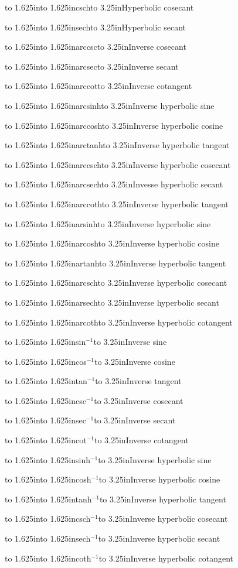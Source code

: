 \documentclass[12pt,twoside]{article}
\def\showop#1#2#3{\noindent
  \hbox to 1.625in{\texttt{\string#1}\hfil}\hbox to 1.625in{#2\hfil}\hbox to 3.25in{#3\hfil}%
  \par}
\begin{document}
\showop{\csch}{csch}{Hyperbolic cosecant}
\showop{\sech}{sech}{Hyperbolic secant}
\showop{\arccsc}{arccsc}{Inverse cosecant}
\showop{\arcsec}{arcsec}{Inverse secant}
\showop{\arccot}{arccot}{Inverse cotangent}
\showop{\arcsinh}{arcsinh}{Inverse hyperbolic sine}
\showop{\arccosh}{arccosh}{Inverse hyperbolic cosine}
\showop{\arctanh}{arctanh}{Inverse hyperbolic tangent}
\showop{\arccsch}{arccsch}{Inverse hyperbolic cosecant}
\showop{\arcsech}{arcsech}{Invesse hyperbolic secant}
\showop{\arccoth}{arccoth}{Inverse hyperbolic tangent}
\showop{\arsinh}{arsinh}{Inverse hyperbolic sine}
\showop{\arcosh}{arcosh}{Inverse hyperbolic cosine}
\showop{\artanh}{artanh}{Inverse hyperbolic tangent}
\showop{\arcsch}{arcsch}{Inverse hyperbolic cosecant}
\showop{\arsech}{arsech}{Inverse hyperbolic secant}
\showop{\arcoth}{arcoth}{Inverse hyperbolic cotangent}
\showop{\sininv}{sin$^{-1}$}{Inverse sine}
\showop{\cosinv}{cos$^{-1}$}{Inverse cosine}
\showop{\taninv}{tan$^{-1}$}{Inverse tangent}
\showop{\cscinv}{csc$^{-1}$}{Inverse cosecant}
\showop{\secinv}{sec$^{-1}$}{Inverse secant}
\showop{\cotinv}{cot$^{-1}$}{Inverse cotangent}
\showop{\sinhinv}{sinh$^{-1}$}{Inverse hyperbolic sine}
\showop{\coshinv}{cosh$^{-1}$}{Inverse hyperbolic cosine}
\showop{\tanhinv}{tanh$^{-1}$}{Inverse hyperbolic tangent}
\showop{\cschinv}{csch$^{-1}$}{Inverse hyperbolic cosecant}
\showop{\sechinv}{sech$^{-1}$}{Inverse hyperbolic secant}
\showop{\cothinv}{coth$^{-1}$}{Inverse hyperbolic cotangent}
\end{document}
